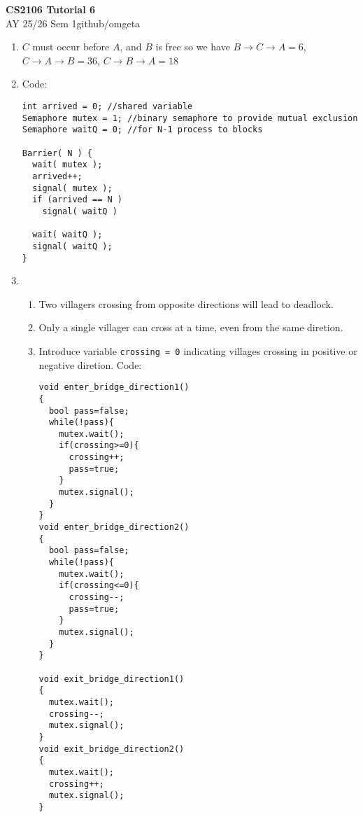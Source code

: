 \documentclass[12pt, a4paper]{article}
\newcommand{\mytitle}{CS2106 Tutorial 6}
\newcommand{\myauthor}{github/omgeta}
\newcommand{\mydate}{AY 25/26 Sem 1}
\begin{document}
\raggedright
\footnotesize
\begin{center}
{\normalsize{\textbf{\mytitle}}} \\
{\footnotesize{\mydate\hspace{2pt}\textemdash\hspace{2pt}\myauthor}}
\end{center}
\begin{enumerate}[Q\arabic*.]
  \item $C$ must occur before $A$, and $B$ is free so we have $B\rightarrow C\rightarrow A = 6$, $C\rightarrow A\rightarrow B = 36$, $C\rightarrow B\rightarrow A = 18$ 

  \item Code:
    \begin{lstlisting}
int arrived = 0; //shared variable
Semaphore mutex = 1; //binary semaphore to provide mutual exclusion
Semaphore waitQ = 0; //for N-1 process to blocks

Barrier( N ) {
  wait( mutex );
  arrived++;
  signal( mutex );
  if (arrived == N )
    signal( waitQ )

  wait( waitQ );
  signal( waitQ );
} 
    \end{lstlisting}

  \item 
    \begin{enumerate}[(\alph*.)]
      \item Two villagers crossing from opposite directions will lead to deadlock.

      \item Only a single villager can cross at a time, even from the same diretion.

      \item Introduce variable \lstinline|crossing = 0| indicating villages crossing in positive or negative diretion. Code:
        \begin{lstlisting}
void enter_bridge_direction1()
{
  bool pass=false;
  while(!pass){
    mutex.wait();
    if(crossing>=0){
      crossing++;
      pass=true;
    }
    mutex.signal();
  }
}
void enter_bridge_direction2()
{
  bool pass=false;
  while(!pass){
    mutex.wait();
    if(crossing<=0){
      crossing--;
      pass=true;
    }
    mutex.signal();
  }
}

void exit_bridge_direction1()
{
  mutex.wait();
  crossing--;
  mutex.signal();
}
void exit_bridge_direction2()
{
  mutex.wait();
  crossing++;
  mutex.signal();
} 
        \end{lstlisting}


\end{enumerate}
\end{enumerate}
\end{document}
